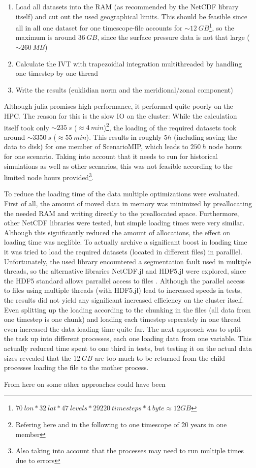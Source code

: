 \begin{enumerate}[itemsep=0mm]
  \item Load all datasets into the RAM (as recommended by the NetCDF library itself) and cut out the used geographical limits. This should be feasible since all in all one dataset for one timescope-file accounts for $\sim 12~GB$\footnote{$70~lon * 32~lat * 47~levels * 29220~timesteps * 4~byte \approx 12 GB$}, so the maximum is around $36~GB$, since the surface pressure data is not that large ($\sim 260~MB$)   
  \item Calculate the IVT with trapezoidial integration multithreaded by handling one time\-step by one thread
  \item Write the results (euklidian norm and the meridional/zonal component)
\end{enumerate}

Although julia promises high performance, it performed quite poorly on the HPC.
The reason for this is the slow IO on the cluster: While the calculation itself took only $\sim 235~s$ ($\approx 4~min$)\footnote{Refering here and  in the following to one timescope of 20 years in one member}, the loading of the required datasets took around $\sim 3350~s$ ($\approx 55~min$). 
This results in roughly $5 h$ (including saving the data to disk) for one member of ScenarioMIP, which leads to $250~h$ node hours for one scenario. 
Taking into account that it needs to run for historical simulations as well as other scenarios, this was not feasible according to the limited node hours provided\footnote{Also taking into account that the processes may need to run multiple times due to errors}.

To reduce the loading time of the data multiple optimizations were evaluated. 
First of all, the amount of moved data in memory was minimized by preallocating the needed RAM and writing directly to the preallocated space. 
Furthermore, other NetCDF libraries were tested, but simple loading times were very similar. 
Although this significantly reduced the amount of allocations, the effect on loading time was neglible. 
To actually archive a significant boost in loading time it was tried to load the required datasets (located in different files) in paralllel. 
Unfortunately, the used library \cite{barth_ncdatasetsjl_2024} encountered a segmentation fault used in multiple threads, so the alternative libraries NetCDF.jl and HDF5.jl were explored, since the HDF5 standard allows parrallel access to files \cite{folk_overview_2011}. 
Although the parallel access to files using multiple threads (with HDF5.jl) lead to increased speeds in tests, the results did not yield any significant increased efficiency on the cluster itself.
Even splitting up the loading according to the chunking in the files (all data from one timestep is one chunk) and loading each timestep seperately in one thread even increased the data loading time quite far.  
The next approach was to split the task up into different processes, each one loading data from one variable. This actually reduced time spent to one third in tests, but testing it on the actual data sizes revealed that the $12~GB$ are too much to be returned from the child processes loading the file to the mother process. 

From here on some ather approaches could have been


